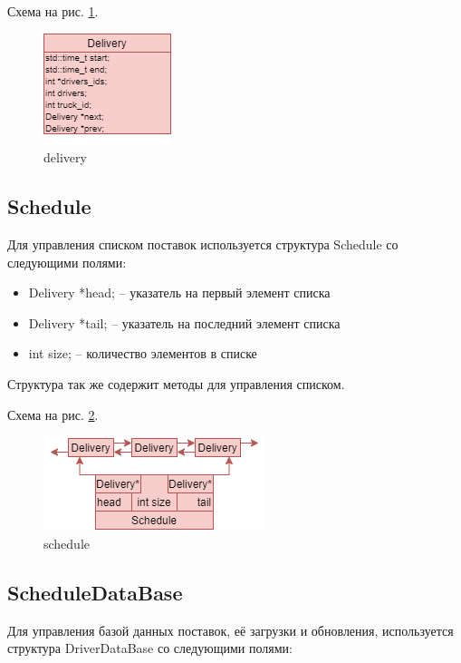 Схема на рис. \ref{delivery}.

\begin{figure}[hpt!]
    \centering
    \includegraphics[width=0.4\linewidth]{photo/delivery}
    \caption{delivery}
    \label{delivery}
\end{figure}

\subsection{Schedule}

Для управления списком поставок используется структура Schedule со следующими полями:

\begin{itemize}
    \item Delivery *head; -- указатель на первый элемент списка
    \item Delivery *tail; -- указатель на последний элемент списка
    \item int size; -- количество элементов в списке
\end{itemize}

Структура так же содержит методы для управления списком.

Схема на рис. \ref{schedule}.

\begin{figure}[hpt!]
    \centering
    \includegraphics[width=0.4\linewidth]{photo/schedule}
    \caption{schedule}
    \label{schedule}
\end{figure}


\subsection{ScheduleDataBase}

Для управления базой данных поставок, 
её загрузки и обновления, 
используется структура DriverDataBase со следующими полями: 


